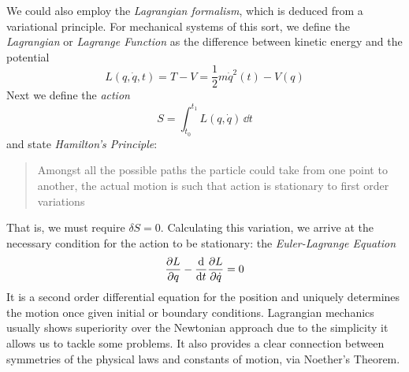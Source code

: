 We could also employ the \textit{Lagrangian formalism}, which is deduced from a variational principle. For mechanical systems of this sort, we define the \textit{Lagrangian} or \textit{Lagrange Function} as the difference between kinetic energy and the potential
\begin{equation}
    L(q,\Dot{q},t)=T-V=\frac{1}{2}m\Dot{q}^2(t)-V(q)
\end{equation}
Next we define the \textit{action}
\begin{equation}
    S=\int_{t_0}^{t_1}L(q,\Dot{q})\,\dd t
\end{equation}
and state \textit{Hamilton's Principle}: 
\begin{quote}
    Amongst all the possible paths the particle could take from one point to another, the actual motion is such that action is stationary to first order variations
\end{quote}
That is, we must require $\delta S=0$. Calculating this variation, we arrive at the necessary condition for the action to be stationary: the \textit{Euler-Lagrange Equation}
\begin{equation}
    \pdv{L}{q}-\dv{t}\pdv{L}{\Dot{q}}=0
    \label{euler_lagrange}
\end{equation}
It is a second order differential equation for the position and uniquely determines the motion once given initial or boundary conditions. Lagrangian mechanics usually shows superiority over the Newtonian approach due to the  simplicity it allows us to tackle some problems. 
It also provides a clear connection between symmetries of the physical laws and constants of motion, via Noether's Theorem.\\

